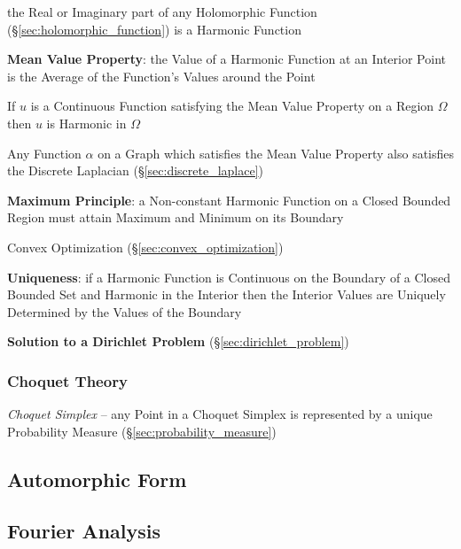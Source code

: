 the Real or Imaginary part of any Holomorphic Function
(\S\ref{sec:holomorphic_function}) is a Harmonic Function


\textbf{Mean Value Property}: the Value of a Harmonic Function at an
Interior Point is the Average of the Function's Values around the
Point

If $u$ is a Continuous Function satisfying the Mean Value Property on
a Region $\Omega$ then $u$ is Harmonic in $\Omega$

Any Function $\alpha$ on a Graph which satisfies the Mean Value
Property also satisfies the Discrete Laplacian
(\S\ref{sec:discrete_laplace})


\textbf{Maximum Principle}: a Non-constant Harmonic Function on a
Closed Bounded Region must attain Maximum and Minimum on its Boundary

Convex Optimization (\S\ref{sec:convex_optimization})


\textbf{Uniqueness}: if a Harmonic Function is Continuous on the
Boundary of a Closed Bounded Set and Harmonic in the Interior then the
Interior Values are Uniquely Determined by the Values of the Boundary


\textbf{Solution to a Dirichlet Problem}
(\S\ref{sec:dirichlet_problem})



\subsubsection{Choquet Theory}\label{sec:choquet_theory}

\emph{Choquet Simplex} -- any Point in a Choquet Simplex is represented by a
unique Probability Measure (\S\ref{sec:probability_measure})



\subsection{Automorphic Form}\label{sec:automorphic_form}

\subsection{Fourier Analysis}\label{sec:fourier_analysis}

